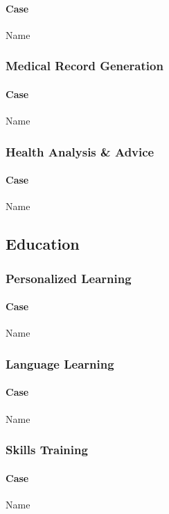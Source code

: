 \documentclass[fleqn,10pt]{SelfArx} %
\begin{document}
\paragraph{Case} Name %

\subsubsection{Medical Record Generation}
\paragraph{Case} Name %

\subsubsection{Health Analysis \& Advice}
\paragraph{Case} Name %


\subsection{Education}

\subsubsection{Personalized Learning}
\paragraph{Case} Name %

\subsubsection{Language Learning}
\paragraph{Case} Name %

\subsubsection{Skills Training}
\paragraph{Case} Name %
\end{document}
